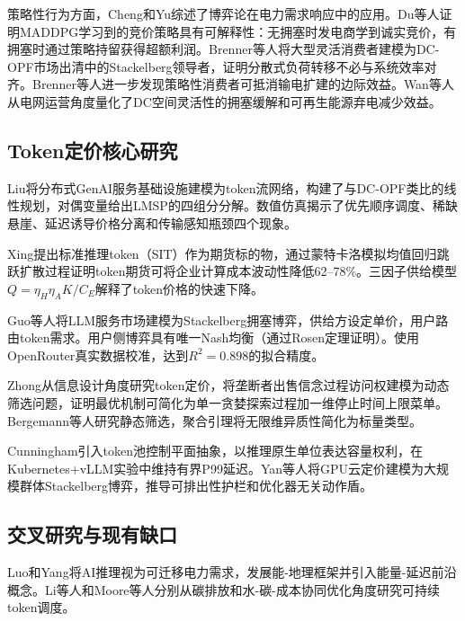 \documentclass[11pt,a4paper,twocolumn]{article}
\begin{document}
策略性行为方面，Cheng和Yu\cite{cheng2019game}综述了博弈论在电力需求响应中的应用。Du等人\cite{du2021approximating}证明MADDPG学习到的竞价策略具有可解释性：无拥塞时发电商学到诚实竞价，有拥塞时通过策略持留获得超额利润。Brenner等人\cite{brenner2026spatial}将大型灵活消费者建模为DC-OPF市场出清中的Stackelberg领导者，证明分散式负荷转移不必与系统效率对齐。Brenner等人\cite{brenner2025strategic}进一步发现策略性消费者可抵消输电扩建的边际效益。Wan等人\cite{wan2025grid}从电网运营角度量化了DC空间灵活性的拥塞缓解和可再生能源弃电减少效益。

\subsection{Token定价核心研究}

Liu\cite{liu2026locational}将分布式GenAI服务基础设施建模为token流网络，构建了与DC-OPF类比的线性规划，对偶变量给出LMSP的四组分分解。数值仿真揭示了优先顺序调度、稀缺悬崖、延迟诱导价格分离和传输感知瓶颈四个现象。

Xing\cite{xing2026tokenfutures}提出标准推理token（SIT）作为期货标的物，通过蒙特卡洛模拟均值回归跳跃扩散过程证明token期货可将企业计算成本波动性降低62--78\%。三因子供给模型$Q = \eta_H \eta_A K / C_E$解释了token价格的快速下降。

Guo等人\cite{guo2025prilm}将LLM服务市场建模为Stackelberg拥塞博弈，供给方设定单价，用户路由token需求。用户侧博弈具有唯一Nash均衡（通过Rosen定理证明）。使用OpenRouter真实数据校准，达到$R^2 = 0.898$的拟合精度。

Zhong\cite{zhong2026token}从信息设计角度研究token定价，将垄断者出售信念过程访问权建模为动态筛选问题，证明最优机制可简化为单一贪婪探索过程加一维停止时间上限菜单。Bergemann等人\cite{bergemann2026menu}研究静态筛选，聚合引理将无限维异质性简化为标量类型。

Cunningham\cite{cunningham2026token}引入token池控制平面抽象，以推理原生单位表达容量权利，在Kubernetes+vLLM实验中维持有界P99延迟。Yan等人\cite{yan2026stackelberg}将GPU云定价建模为大规模群体Stackelberg博弈，推导可排出性护栏和优化器无关动作盾。

\subsection{交叉研究与现有缺口}

Luo和Yang\cite{luo2026aiinference}将AI推理视为可迁移电力需求，发展能-地理框架并引入能量-延迟前沿概念。Li等人\cite{li2025ecoserve}和Moore等人\cite{moore2025slit}分别从碳排放和水-碳-成本协同优化角度研究可持续token调度。
\end{document}
